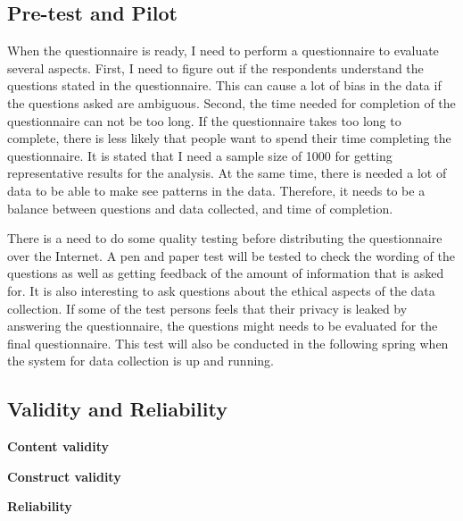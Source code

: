   \subsection{Pre-test and Pilot}\label{sec:pretest}
    When the questionnaire is ready, I need to perform a questionnaire to evaluate several aspects. First, I need to figure out if the respondents understand the questions stated in the questionnaire. This can cause a lot of bias in the data if the questions asked are ambiguous. Second, the time needed for completion of the questionnaire can not be too long. If the questionnaire takes too long to complete, there is less likely that people want to spend their time completing the questionnaire. It is stated that I need a sample size of 1000 for getting representative results for the analysis. At the same time, there is needed a lot of data to be able to make see patterns in the data. Therefore, it needs to be a balance between questions and data collected, and time of completion. 

    There is a need to do some quality testing before distributing the questionnaire over the Internet. A pen and paper test will be tested to check the wording of the questions as well as getting feedback of the amount of information that is asked for. It is also interesting to ask questions about the ethical aspects of the data collection. If some of the test persons feels that their privacy is leaked by answering the questionnaire, the questions might needs to be evaluated for the final questionnaire. 
    This test will also be conducted in the following spring when the system for data collection is up and running. 


  \subsection{Validity and Reliability}\label{sec:validityandreliability}

    {\bf Content validity}

    {\bf Construct validity}

    {\bf Reliability}